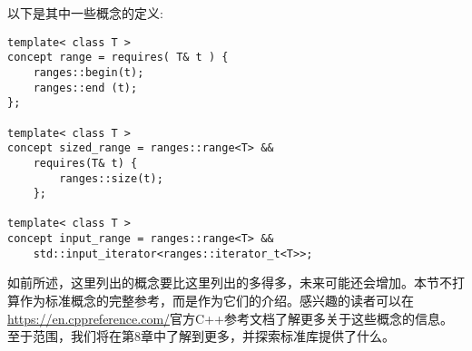 以下是其中一些概念的定义:

\begin{lstlisting}[style=styleCXX]
template< class T >
concept range = requires( T& t ) {
	ranges::begin(t);
	ranges::end (t);
};

template< class T >
concept sized_range = ranges::range<T> &&
	requires(T& t) {
		ranges::size(t);
	};

template< class T >
concept input_range = ranges::range<T> &&
	std::input_iterator<ranges::iterator_t<T>>;
\end{lstlisting}

如前所述，这里列出的概念要比这里列出的多得多，未来可能还会增加。本节不打算作为标准概念的完整参考，而是作为它们的介绍。感兴趣的读者可以在\url{https://en.cppreference.com/}官方C++参考文档了解更多关于这些概念的信息。至于范围，我们将在第8章中了解到更多，并探索标准库提供了什么。































